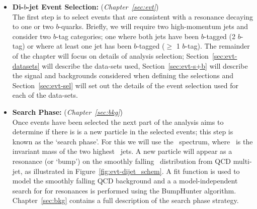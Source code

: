 \begin{itemize}[leftmargin=*]
\item\textbf{Di-$b$-jet Event Selection:} (\textit{Chapter~\ref{sec:evt}})\\
  The first step is to select events that are consistent with a resonance decaying to one or two $b$-quarks.
  Briefly, we will require two high-momentum jets and consider two $b$-tag categories;
  one where both jets have been $b$-tagged (2 $b$-tag) or where at least one jet has been $b$-tagged ($\geq$ 1 $b$-tag).
  The remainder of the chapter will focus on details of analysis selection;
  Section~\ref{sec:evt-datasets} will describe the data-sets used,
  Section~\ref{sec:evt-s+b} will describe the signal and backgrounds
  considered when defining the selections
  and Section~\ref{sec:evt-sel} will set out
  the details of the event selection used for each of the data-sets.
  \\
\item\textbf{Search Phase:} (\textit{Chapter~\ref{sec:bkg}})\\
  Once events have been selected the next part of the analysis aims to determine if there is
  is a new particle in the selected events; this step is known as the `search phase'.
  For this we will use the \mjj~spectrum, where \mjj~is the invariant mass of the two highest \pT~jets.
  A new particle will appear as a resonance (or `bump') on the smoothly falling
  \mjj~distribution from QCD multi-jet, as illustrated in Figure~\ref{fig:evt-dijet_schem}.
  A fit function is used to model the smoothly falling QCD background and a
  a model-independent search for for resonances is performed using the BumpHunter algorithm.
  Chapter~\ref{sec:bkg} contains a full description of the search phase strategy.
  \\
  

\end{itemize}
